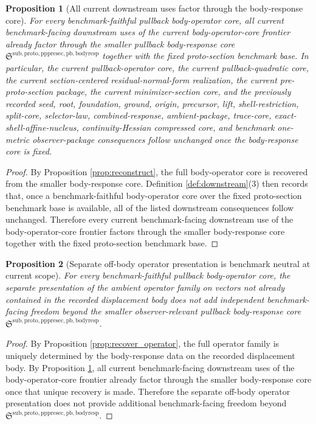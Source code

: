 \documentclass[11pt]{article}
\newcommand{\PullbackBodyResponseCore}{\mathfrak S^{\mathrm{sub,proto,pppresec,pb,bodyresp}}}
\newtheorem{proposition}{Proposition}
\begin{document}
\begin{proposition}[All current downstream uses factor through the body-response core]
\label{prop:downstream}
For every benchmark-faithful pullback body-operator core, all current benchmark-facing downstream uses of the current body-operator-core frontier already factor through the smaller pullback body-response core \(\PullbackBodyResponseCore\) together with the fixed proto-section benchmark base. In particular, the current pullback-operator core, the current pullback-quadratic core, the current section-centered residual-normal-form realization, the current pre-proto-section package, the current minimizer-section core, and the previously recorded seed, root, foundation, ground, origin, precursor, lift, shell-restriction, split-core, selector-law, combined-response, ambient-package, trace-core, exact-shell-affine-nucleus, continuity-Hessian compressed core, and benchmark one-metric observer-package consequences follow unchanged once the body-response core is fixed.
\end{proposition}

\begin{proof}
By Proposition \ref{prop:reconstruct}, the full body-operator core is recovered from the smaller body-response core. Definition \ref{def:downstream}(3) then records that, once a benchmark-faithful body-operator core over the fixed proto-section benchmark base is available, all of the listed downstream consequences follow unchanged. Therefore every current benchmark-facing downstream use of the body-operator-core frontier factors through the smaller body-response core together with the fixed proto-section benchmark base.
\end{proof}

\begin{proposition}[Separate off-body operator presentation is benchmark neutral at current scope]
\label{prop:neutral}
For every benchmark-faithful pullback body-operator core, the separate presentation of the ambient operator family on vectors not already contained in the recorded displacement body does not add independent benchmark-facing freedom beyond the smaller observer-relevant pullback body-response core \(\PullbackBodyResponseCore\).
\end{proposition}

\begin{proof}
By Proposition \ref{prop:recover_operator}, the full operator family is uniquely determined by the body-response data on the recorded displacement body. By Proposition \ref{prop:downstream}, all current benchmark-facing downstream uses of the body-operator-core frontier already factor through the smaller body-response core once that unique recovery is made. Therefore the separate off-body operator presentation does not provide additional benchmark-facing freedom beyond \(\PullbackBodyResponseCore\).
\end{proof}
\end{document}
